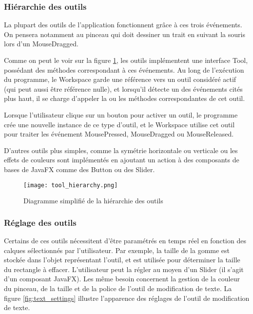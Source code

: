 \subsubsection{Hiérarchie des outils}
\par
La plupart des outils de l'application  fonctionnent grâce à ces trois événements. On pensera notamment au pinceau qui doit dessiner un trait en suivant la souris lors d'un MouseDragged.
\par
Comme on peut le voir sur la figure \ref{fig:tool_hier}, les outils implémentent une interface Tool, possédant des méthodes correspondant à ces événements. Au long de l'exécution du programme, le Workspace garde une référence vers un outil considéré actif (qui peut aussi être référence nulle), et lorsqu'il détecte un des événements cités plus haut, il se charge d'appeler la ou les méthodes correspondantes de cet outil.
\par
Lorsque l'utilisateur clique sur un bouton pour activer un outil, le programme crée une nouvelle instance de ce type d'outil, et le Workspace utilise cet outil pour traiter les événement MousePressed, MouseDragged ou MouseReleased.
\par
D'autres outils plus simples, comme la symétrie horizontale ou verticale ou les effets de couleurs sont implémentés en ajoutant un action à des composants de bases de JavaFX comme des Button ou des Slider.

\begin{figure}[H]
	\caption{Diagramme simplifié de la hiérarchie des outils}
	\centering
	\texttt{[image: tool\_hierarchy.png]}
	\label{fig:tool_hier}
\end{figure}

\subsubsection{Réglage des outils} \label{reglage-outils}
Certains de ces outils nécessitent d'être paramétrés en temps réel en fonction des calques sélectionnés par l'utilisateur. Par exemple, la taille de la gomme est stockée dans l'objet représentant l'outil, et est utilisée pour déterminer la taille du rectangle à effacer. L'utilisateur peut la régler au moyen d'un Slider (il s'agit d'un composant JavaFX). Les même besoin concernent la gestion de la couleur du pinceau, de la taille et de la police de l'outil de modification de texte. La figure \ref{fig:text_settings} illustre l'apparence des réglages de l'outil de modification de texte.

